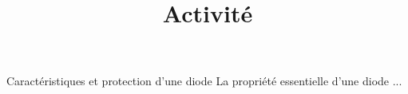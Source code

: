 \documentclass[10pt]{article}
\newcommand{\titreActivite}{Activité} %
\begin{document}
\date{}
\title{\titreActivite}
\maketitle %


\begin{documentpeda}{Caractéristiques et protection d’une diode}
	La propriété essentielle
	d’une diode ...
\end{documentpeda}

\begin{question}
\end{question}
\end{document}
